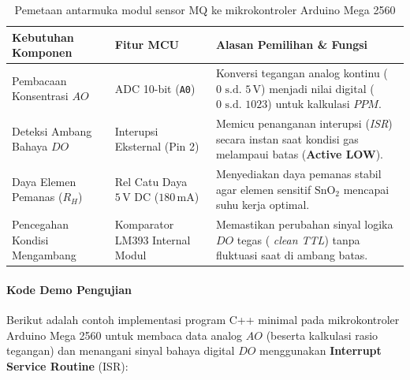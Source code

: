 \begin{table}[H]
	\centering
	\caption{Pemetaan antarmuka modul sensor MQ ke mikrokontroler Arduino Mega 2560}
	\label{tab:mq_mcu_mapping}
	\small
	\begin{tabularx}{\textwidth}{@{}p{5.0cm}XX@{}}
		\toprule
		Kebutuhan Komponen            & Fitur MCU                                         & Alasan Pemilihan \& Fungsi                                                                                                 \\
		\midrule
		Pembacaan Konsentrasi $AO$    & ADC 10-bit (\texttt{A0})                          & Konversi tegangan analog kontinu ($0\text{ s.d. }5\,\text{V}$) menjadi nilai digital ($0\text{ s.d. }1023$) untuk kalkulasi $PPM$. \\
		Deteksi Ambang Bahaya $DO$    & Interupsi Eksternal (Pin 2)                       & Memicu penanganan interupsi (\textit{ISR}) secara instan saat kondisi gas melampaui batas (\textbf{Active LOW}).           \\
		Daya Elemen Pemanas ($R_H$)   & Rel Catu Daya $5\,\text{V DC}$ ($180\,\text{mA}$) & Menyediakan daya pemanas stabil agar elemen sensitif $\text{SnO}_2$ mencapai suhu kerja optimal.                           \\
		Pencegahan Kondisi Mengambang & Komparator LM393 Internal Modul                   & Memastikan perubahan sinyal logika $DO$ tegas (
		\textit{clean TTL}) tanpa fluktuasi saat di ambang batas.                                                                                                                                                      \\
		\bottomrule
	\end{tabularx}
\end{table}

\paragraph{Kode Demo Pengujian}
Berikut adalah contoh implementasi program C++ minimal pada mikrokontroler Arduino Mega 2560 untuk membaca data analog $AO$ (beserta kalkulasi rasio tegangan) dan menangani sinyal bahaya digital $DO$ menggunakan \textbf{Interrupt Service Routine} (ISR):

